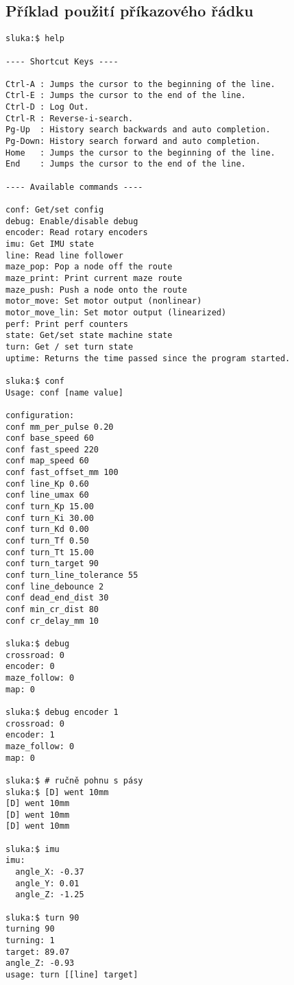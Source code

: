 \documentclass[a4paper,11pt]{article}
\begin{document}
\listoftodos


\clearpage
\begin{appendices}
    \section{Příklad použití příkazového řádku}
    \label{app:CLI}
    \begin{lstlisting}[style=terminal]
sluka:$ help

---- Shortcut Keys ----

Ctrl-A : Jumps the cursor to the beginning of the line.
Ctrl-E : Jumps the cursor to the end of the line.
Ctrl-D : Log Out.
Ctrl-R : Reverse-i-search.
Pg-Up  : History search backwards and auto completion.
Pg-Down: History search forward and auto completion.
Home   : Jumps the cursor to the beginning of the line.
End    : Jumps the cursor to the end of the line.

---- Available commands ----

conf: Get/set config
debug: Enable/disable debug
encoder: Read rotary encoders
imu: Get IMU state
line: Read line follower
maze_pop: Pop a node off the route
maze_print: Print current maze route
maze_push: Push a node onto the route
motor_move: Set motor output (nonlinear)
motor_move_lin: Set motor output (linearized)
perf: Print perf counters
state: Get/set state machine state
turn: Get / set turn state
uptime: Returns the time passed since the program started.

sluka:$ conf
Usage: conf [name value]

configuration:
conf mm_per_pulse 0.20
conf base_speed 60
conf fast_speed 220
conf map_speed 60
conf fast_offset_mm 100
conf line_Kp 0.60
conf line_umax 60
conf turn_Kp 15.00
conf turn_Ki 30.00
conf turn_Kd 0.00
conf turn_Tf 0.50
conf turn_Tt 15.00
conf turn_target 90
conf turn_line_tolerance 55
conf line_debounce 2
conf dead_end_dist 30
conf min_cr_dist 80
conf cr_delay_mm 10

sluka:$ debug
crossroad: 0
encoder: 0
maze_follow: 0
map: 0

sluka:$ debug encoder 1
crossroad: 0
encoder: 1
maze_follow: 0
map: 0

sluka:$ # ručně pohnu s pásy
sluka:$ [D] went 10mm
[D] went 10mm
[D] went 10mm
[D] went 10mm

sluka:$ imu
imu:
  angle_X: -0.37
  angle_Y: 0.01
  angle_Z: -1.25

sluka:$ turn 90
turning 90
turning: 1
target: 89.07
angle_Z: -0.93
usage: turn [[line] target]


\end{lstlisting}
\end{appendices}
\end{document}
